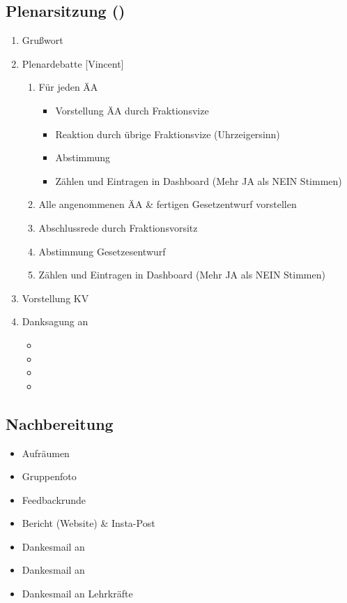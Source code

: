 \documentclass{article}
\newcommand{\EP}{Vincent}
\begin{document}
	\subsection{Plenarsitzung (\timePlenar)}
	\begin{enumerate}
		\item Grußwort \newline
        [\STADTVERTRETER]
		\item Plenardebatte [\EP]
		\begin{enumerate}
			\item Für jeden ÄA
			\begin{itemize}
				\item Vorstellung ÄA durch Fraktionsvize
				\item Reaktion durch übrige Fraktionsvize (Uhrzeigersinn)
				\item Abstimmung
				\item Zählen und Eintragen in Dashboard \newline (Mehr JA als NEIN Stimmen)
			\end{itemize}
			\item Alle angenommenen ÄA \& fertigen Gesetzentwurf vorstellen
			\item Abschlussrede durch Fraktionsvorsitz
			\item Abstimmung Gesetzesentwurf
			\item Zählen und Eintragen in Dashboard (Mehr JA als NEIN Stimmen)
		\end{enumerate}
		\item Vorstellung KV
		\item Danksagung an
		\begin{itemize}
            \item \STADTVERTRETER
			\item \EUVERTRETER
			\item \VERANSTALTUNGSORT
			\item \FOERDERER
		\end{itemize}
	\end{enumerate}
	
	\subsection{Nachbereitung}
	\begin{itemize}
		\item Aufräumen
		\item Gruppenfoto
		\item Feedbackrunde
		\item Bericht (Website) \& Insta-Post
		\item Dankesmail an \STADTVERTRETER
		\item Dankesmail an \EUVERTRETER
		\item Dankesmail an Lehrkräfte
	\end{itemize}
    \newpage
\end{document}
